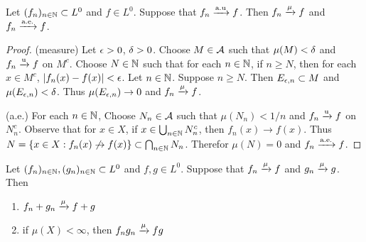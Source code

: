 \documentclass{book}
\begin{document}
	\begin{ex}  
		Let $(f_n)_{n \in \mathbb{N}} \subset L^0$ and $f \in L^0$. Suppose that $f_n \xrightarrow{\text{a.u}} f$. Then $f_n \xrightarrow{\mu}f$ and $f_n \xrightarrow{\text{a.e.}}f$. 
	\end{ex}
	
	\begin{proof}
		(measure) Let $\epsilon>0$, $\delta >0$. Choose $M \in \mathcal{A}$ such that $\mu(M) < \delta$ and $f_n \xrightarrow{\text{u}} f$ on $M^c$. Choose $N \in \mathbb{N}$ such that for each $n \in \mathbb{N}$, if $n \geq N$, then for each $x \in M^c$, $|f_n(x) - f(x)| < \epsilon$. Let $n \in \mathbb{N}$. Suppose $n \geq N$. Then $E_{\epsilon,n} \subset M$ and $\mu(E_{\epsilon,n}) < \delta$. Thus $\mu(E_{\epsilon,n}) \rightarrow 0$ and $f_n \xrightarrow{\mu} f$.
		
		(a.e.) For each $n \in \mathbb{N}$, Choose $N_n \in \mathcal{A}$ such that $\mu(N_n) < 1/n$ and $f_n \xrightarrow{\text{u}} f$ on $N_n^c$. Observe that for $x \in X$, if $x \in \bigcup_{n \in \mathbb{N}}N_n^c$, then $f_n(x) \rightarrow f(x)$. Thus $N = \{x \in X: f_n(x) \not \rightarrow f(x)\} \subset \bigcap_{n \in \mathbb{N}} N_n$. Therefor $\mu(N) = 0$ and $f_n \xrightarrow{\text{a.e.}} f$.
	\end{proof}
	
	\begin{ex}  
		Let $(f_n)_{n \in \mathbb{N}}, (g_n)_{n \in \mathbb{N}} \subset L^0$ and $f,g \in L^0$. Suppose that $f_n \xrightarrow{\mu} f$ and $g_n \xrightarrow{\mu}g$. Then 
		\begin{enumerate}
			\item $f_n + g_n \xrightarrow{\mu} f+g$
			\item if $\mu(X) < \infty$, then $f_n g_n \xrightarrow{\mu} fg$
		\end{enumerate}
	\end{ex}
	
\end{document}
